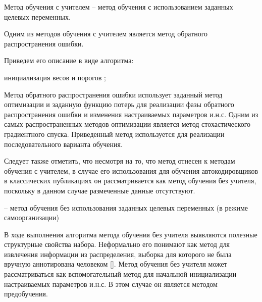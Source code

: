 Метод обучения с учителем -- метод обучения с использованием заданных целевых переменных.

Одним из методов обучения с учителем является метод обратного распространения ошибки.

Приведем его описание в виде алгоритма:

\begin{algorithm}[H]
	инициализация весов  и порогов ;\\
\end{algorithm}

Метод обратного распространения ошибки использует заданный метод оптимизации и заданную функцию потерь для реализации фазы обратного распространения ошибки и изменения настраиваемых параметров и.н.с. Одним из самых распространенных методов оптимизации является метод стохастического градиентного спуска. Приведенный метод используется для реализации последовательного варианта обучения.

Следует также отметить, что несмотря на то, что метод отнесен к методам обучения с учителем, в случае
его использования для обучения автокодировщиков в классических публикациях он рассматривается как
метод обучения без учителя, поскольку в данном случае размеченные данные отсутствуют.

\textbf{} -- метод обучения без использования заданных целевых переменных (в режиме самоорганизации)

В ходе выполнения алгоритма метода обучения без учителя выявляются полезные структурные свойства
набора. Неформально его понимают как метод для извлечения информации из распределения, выборка для которого
не была вручную аннотирована человеком []. Метод обучения без учителя может рассматриваться как вспомогательный метод для начальной инициализации настраиваемых параметров и.н.с. В этом случае он является методом предобучения.

